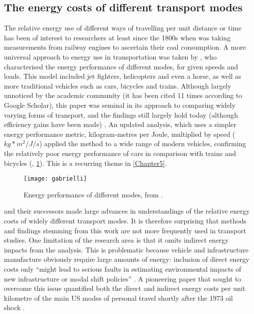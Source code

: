 \subsection{The energy costs of different transport modes}
The relative energy use of different ways of travelling per unit distance
or time has been of interest
to researchers at least since the 1800s when \citet{tredgold1835practical}
was taking measurements from railway engines to ascertain their coal
consumption. A more universal approach to energy use in transportation
was taken by \citet{Gabrielli1950}, who characterised the energy performance of
different modes, for given speeds and loads. This model included jet fighters,
helicopters and even a horse, as well as more traditional vehicles such as
cars, bicycles and trains. Although largely unnoticed by the academic
community (it has been cited 11 times according to Google Scholar), this
paper was seminal in its approach to comparing widely varying forms of
transport, and the findings still largely hold today (although efficiency
gains have been made) \citep{yong2005price}. An updated analysis, which uses
a simpler energy performance metric, kilogram-metres per Joule, multiplied
by speed ($kg*m^2/J/s$) applied the method
to a wide range of modern vehicles, confirming the relatively poor energy
performance of cars in comparison with trains and bicycles (\citealp{Radtke2008},
\cref{fgabrielli}). This is a recurring theme in \cref{Chapter5}.

\begin{figure}[htbp]
  \centerline{
    \texttt{[image: gabrielli]}}
  \caption{Energy performance of different modes, from \citep{Radtke2008}.} %
  \label{fgabrielli}
\end{figure}

\citet{Gabrielli1950} and their successors made large advances in understandings
of the relative energy costs of widely different transport modes.
It is therefore surprising that methods and findings stemming from this
work are not more frequently used in transport studies.
One limitation of the research area is that it omits indirect energy impacts from
the analysis.
This is problematic because vehicle and infrastructure manufacture obviously
require large amounts of energy: inclusion of direct energy costs only
``might lead to serious faults in estimating environmental impacts of new
infrastructure or modal shift policies'' \citep[p.~23]{Wee2005}.
A pioneering paper that sought to overcome this issue quantified
both the direct and indirect
energy costs per unit kilometre of the main US modes of personal travel shortly
after the 1973 oil shock \citep{Fels1975}.

